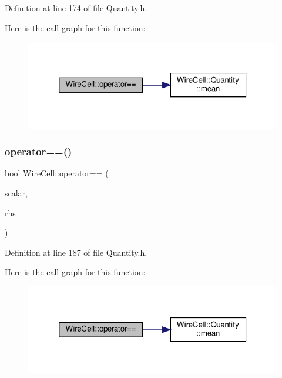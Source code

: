 Definition at line 174 of file Quantity.\+h.

Here is the call graph for this function\+:
\nopagebreak
\begin{figure}[H]
\begin{center}
\leavevmode
\includegraphics[width=320pt]{namespace_wire_cell_aa6e0b8af0c1d7e1cddab2efdb66c92ae_cgraph}
\end{center}
\end{figure}
\mbox{\label{namespace_wire_cell_acaced6e975be88ae44140c377b0b1ae6}} 
\subsubsection{\texorpdfstring{operator==()}{operator==()}\hspace{0.1cm}{\footnotesize\ttfamily [3/3]}}
{\footnotesize\ttfamily bool Wire\+Cell\+::operator== (\begin{DoxyParamCaption}\item[{const double \&}]{scalar,  }\item[{const \hyperlink{class_wire_cell_1_1_quantity}{Wire\+Cell\+::\+Quantity} \&}]{rhs }\end{DoxyParamCaption})\hspace{0.3cm}{\ttfamily [inline]}}



Definition at line 187 of file Quantity.\+h.

Here is the call graph for this function\+:
\nopagebreak
\begin{figure}[H]
\begin{center}
\leavevmode
\includegraphics[width=320pt]{namespace_wire_cell_acaced6e975be88ae44140c377b0b1ae6_cgraph}
\end{center}
\end{figure}
\mbox{\label{namespace_wire_cell_a998a57c55b36e2d63d5cb6c726153215}} 

